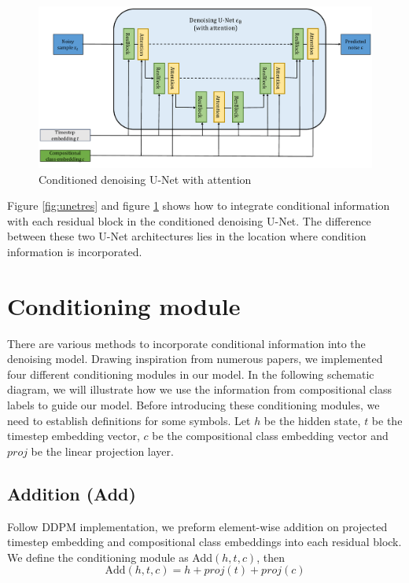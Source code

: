\begin{figure} [H]
    \centering
    \includegraphics[width=1\linewidth]{figures/UNetAttention.pdf}
    \caption{Conditioned denoising U-Net with attention}
    \label{fig:unetattention}
\end{figure}


Figure \ref{fig:unetres} and figure \ref{fig:unetattention} shows how to integrate conditional information with each residual block in the conditioned denoising U-Net. The difference between these two U-Net architectures lies in the location where condition information is incorporated.

\section{Conditioning module}
\label{subsec: conditioning module}
There are various methods to incorporate conditional information into the denoising model. Drawing inspiration from numerous papers, we implemented four different conditioning modules in our model. In the following schematic diagram, we will illustrate how we use the information from compositional class labels to guide our model. Before introducing these conditioning modules, we need to establish definitions for some symbols. Let $h$ be the hidden state, $t$ be the timestep embedding vector, $c$ be the compositional class embedding vector and $proj$ be the linear projection layer.
\subsection{Addition (Add)}
Follow DDPM\cite{ho2020denoising} implementation, we preform element-wise addition on projected timestep embedding and compositional class embeddings into each residual block. We define the conditioning module as Add$(h, t, c)$, then
\begin{equation}
    \text{Add}(h, t, c) = h + proj(t) + proj(c)
\end{equation}

